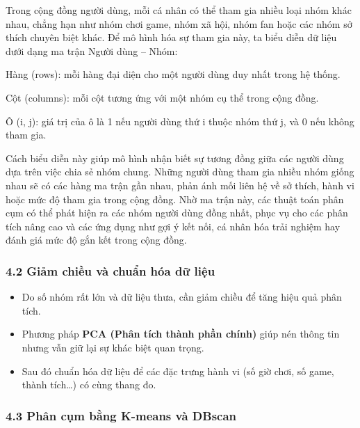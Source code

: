 \documentclass[
  11pt,
]{article}
\providecommand{\tightlist}{%
  \setlength{\itemsep}{0pt}\setlength{\parskip}{0pt}}
\begin{document}
Trong cộng đồng người dùng, mỗi cá nhân có thể tham gia nhiều loại nhóm
khác nhau, chẳng hạn như nhóm chơi game, nhóm xã hội, nhóm fan hoặc các
nhóm sở thích chuyên biệt khác. Để mô hình hóa sự tham gia này, ta biểu
diễn dữ liệu dưới dạng ma trận Người dùng -- Nhóm:

Hàng (rows): mỗi hàng đại diện cho một người dùng duy nhất trong hệ
thống.

Cột (columns): mỗi cột tương ứng với một nhóm cụ thể trong cộng đồng.

Ô (i, j): giá trị của ô là 1 nếu người dùng thứ i thuộc nhóm thứ j, và 0
nếu không tham gia.

Cách biểu diễn này giúp mô hình nhận biết sự tương đồng giữa các người
dùng dựa trên việc chia sẻ nhóm chung. Những người dùng tham gia nhiều
nhóm giống nhau sẽ có các hàng ma trận gần nhau, phản ánh mối liên hệ về
sở thích, hành vi hoặc mức độ tham gia trong cộng đồng. Nhờ ma trận này,
các thuật toán phân cụm có thể phát hiện ra các nhóm người dùng đồng
nhất, phục vụ cho các phân tích nâng cao và các ứng dụng như gợi ý kết
nối, cá nhân hóa trải nghiệm hay đánh giá mức độ gắn kết trong cộng
đồng.

\hypertarget{giux1ea3m-chiux1ec1u-vuxe0-chuux1ea9n-huxf3a-dux1eef-liux1ec7u}{%
\subsubsection{4.2 Giảm chiều và chuẩn hóa dữ
liệu}\label{giux1ea3m-chiux1ec1u-vuxe0-chuux1ea9n-huxf3a-dux1eef-liux1ec7u}}

\begin{itemize}
\tightlist
\item
  Do số nhóm rất lớn và dữ liệu thưa, cần giảm chiều để tăng hiệu quả
  phân tích.\\
\item
  Phương pháp \textbf{PCA (Phân tích thành phần chính)} giúp nén thông
  tin nhưng vẫn giữ lại sự khác biệt quan trọng.\\
\item
  Sau đó chuẩn hóa dữ liệu để các đặc trưng hành vi (số giờ chơi, số
  game, thành tích\ldots) có cùng thang đo.
\end{itemize}

\hypertarget{phuxe2n-cum-bux103ng-k-means-va-dbscan}{%
\subsubsection{4.3 Phân cụm bằng K-means và
DBscan}\label{phuxe2n-cum-bux103ng-k-means-va-dbscan}}
\end{document}
